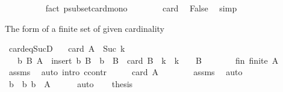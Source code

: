\begin{isabellebody}
\ \ \ \ \ \ \ \ \isamarkupfalse%
\ {\isacharparenleft}{\kern0pt}fact\ psubset{\isacharunderscore}{\kern0pt}card{\isacharunderscore}{\kern0pt}mono{\isacharparenright}{\kern0pt}\isanewline
\ \ \ \ \ \ \isamarkupfalse%
\ card\ \isamarkupfalse%
\ False\ \isamarkupfalse%
\ simp\isanewline
\ \ \ \ \isamarkupfalse%
\isanewline
\ \ \isamarkupfalse%
\isanewline
{}\isamarkupfalse%
%
\endisatagproof
{\isafoldproof}%
%
\isadelimproof
%
\endisadelimproof
%
\begin{isamarkuptext}%
The form of a finite set of given cardinality%
\end{isamarkuptext}\isamarkuptrue%
\isamarkupfalse%
\ card{\isacharunderscore}{\kern0pt}eq{\isacharunderscore}{\kern0pt}SucD{\isacharcolon}{\kern0pt}\isanewline
\ \ \ {\isachardoublequoteopen}card\ A\ {\isacharequal}{\kern0pt}\ Suc\ k{\isachardoublequoteclose}\isanewline
\ \ \ {\isachardoublequoteopen}{\isasymexists}b\ B{\isachardot}{\kern0pt}\ A\ {\isacharequal}{\kern0pt}\ insert\ b\ B\ {\isasymand}\ b\ {\isasymnotin}\ B\ {\isasymand}\ card\ B\ {\isacharequal}{\kern0pt}\ k\ {\isasymand}\ {\isacharparenleft}{\kern0pt}k\ {\isacharequal}{\kern0pt}\ {}\ {\isasymlongrightarrow}\ B\ {\isacharequal}{\kern0pt}\ {\isacharbraceleft}{\kern0pt}{\isacharbraceright}{\kern0pt}{\isacharparenright}{\kern0pt}{\isachardoublequoteclose}\isanewline
%
\isadelimproof
%
\endisadelimproof
%
\isatagproof
{}\isamarkupfalse%
\ {\isacharminus}{\kern0pt}\isanewline
\ \ \isamarkupfalse%
\ fin{\isacharcolon}{\kern0pt}\ {\isachardoublequoteopen}finite\ A{\isachardoublequoteclose}\isanewline
\ \ \ \ \isamarkupfalse%
\ assms\ \isamarkupfalse%
\ {\isacharparenleft}{\kern0pt}auto\ intro{\isacharcolon}{\kern0pt}\ ccontr{\isacharparenright}{\kern0pt}\isanewline
\ \ \isamarkupfalse%
\ \isamarkupfalse%
\ {\isachardoublequoteopen}card\ A\ {\isasymnoteq}\ {}{\isachardoublequoteclose}\isanewline
\ \ \ \ \isamarkupfalse%
\ assms\ \isamarkupfalse%
\ auto\isanewline
\ \ \isamarkupfalse%
\ \isamarkupfalse%
\ b\ \ b{\isacharcolon}{\kern0pt}\ {\isachardoublequoteopen}b\ {\isasymin}\ A{\isachardoublequoteclose}\isanewline
\ \ \ \ \isamarkupfalse%
\ auto\isanewline
\ \ \isamarkupfalse%
\ {\isacharquery}{\kern0pt}thesis\isanewline

\end{isabellebody}

